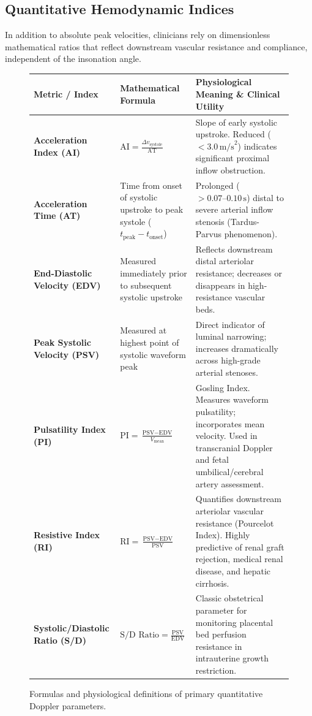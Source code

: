 \documentclass[11pt,a4paper]{article}
\begin{document}
\subsection{Quantitative Hemodynamic Indices}

In addition to absolute peak velocities, clinicians rely on dimensionless mathematical ratios that reflect downstream vascular resistance and compliance, independent of the insonation angle.

\begin{figure}[htbp]
\centering
\begin{tabular}{lp{5.5cm}p{6.0cm}}
\toprule
\textbf{Metric / Index} & \textbf{Mathematical Formula} & \textbf{Physiological Meaning \& Clinical Utility} \\
\midrule
\textbf{Acceleration Index (AI)} & $\displaystyle \text{AI} = \frac{\Delta v_{\text{systole}}}{\text{AT}}$ & Slope of early systolic upstroke. Reduced ($< 3.0\,\text{m/s}^2$) indicates significant proximal inflow obstruction. \\
\addlinespace
\textbf{Acceleration Time (AT)} & Time from onset of systolic upstroke to peak systole ($t_{\text{peak}} - t_{\text{onset}}$) & Prolonged ($> 0.07\text{--}0.10\,\text{s}$) distal to severe arterial inflow stenosis (Tardus-Parvus phenomenon). \\
\addlinespace
\textbf{End-Diastolic Velocity (EDV)} & Measured immediately prior to subsequent systolic upstroke & Reflects downstream distal arteriolar resistance; decreases or disappears in high-resistance vascular beds. \\
\addlinespace
\textbf{Peak Systolic Velocity (PSV)} & Measured at highest point of systolic waveform peak & Direct indicator of luminal narrowing; increases dramatically across high-grade arterial stenoses. \\
\addlinespace
\textbf{Pulsatility Index (PI)} & $\displaystyle \text{PI} = \frac{\text{PSV} - \text{EDV}}{V_{\text{mean}}}$ & Gosling Index. Measures waveform pulsatility; incorporates mean velocity. Used in transcranial Doppler and fetal umbilical/cerebral artery assessment. \\
\addlinespace
\textbf{Resistive Index (RI)} & $\displaystyle \text{RI} = \frac{\text{PSV} - \text{EDV}}{\text{PSV}}$ & Quantifies downstream arteriolar vascular resistance (Pourcelot Index). Highly predictive of renal graft rejection, medical renal disease, and hepatic cirrhosis. \\
\addlinespace
\textbf{Systolic/Diastolic Ratio (S/D)} & $\displaystyle \text{S/D Ratio} = \frac{\text{PSV}}{\text{EDV}}$ & Classic obstetrical parameter for monitoring placental bed perfusion resistance in intrauterine growth restriction. \\
\bottomrule
\end{tabular}
\caption{Formulas and physiological definitions of primary quantitative Doppler parameters.}
\label{tab:doppler_indices}
\end{figure}
\end{document}

